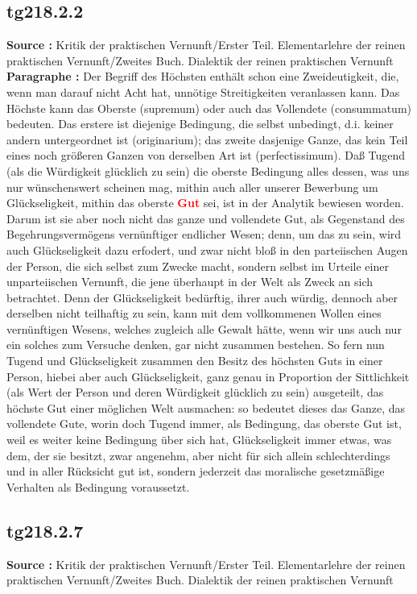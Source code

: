 \documentclass[a4paper,12pt,twoside]{book}
\newcommand{\match}[1]{\textcolor{red}{\textbf{#1}}}
\begin{document}
	\subsection*{tg218.2.2} 
	\textbf{Source : }Kritik der praktischen Vernunft/Erster Teil. Elementarlehre der reinen praktischen Vernunft/Zweites Buch. Dialektik der reinen praktischen Vernunft\\  
	
	\noindent\textbf{Paragraphe : }Der Begriff des Höchsten enthält schon eine Zweideutigkeit, die, wenn man darauf nicht Acht hat, unnötige Streitigkeiten veranlassen kann. Das Höchste kann das Oberste (supremum) oder auch das Vollendete (consummatum) bedeuten. Das erstere ist diejenige Bedingung, die selbst unbedingt, d.i. keiner andern untergeordnet ist (originarium); das zweite dasjenige Ganze, das kein Teil eines noch größeren Ganzen von derselben Art ist (perfectissimum). Daß Tugend (als die Würdigkeit glücklich zu sein) die oberste Bedingung alles dessen, was uns nur wünschenswert scheinen mag, mithin auch aller unserer Bewerbung um Glückseligkeit, mithin das oberste \match{Gut} sei, ist in der Analytik bewiesen worden. Darum ist sie aber noch nicht das ganze und vollendete Gut, als Gegenstand des Begehrungsvermögens vernünftiger endlicher Wesen; denn, um das zu sein, wird auch Glückseligkeit dazu erfodert, und zwar nicht bloß in den parteiischen Augen der Person, die sich selbst zum Zwecke macht, sondern selbst im Urteile einer unparteiischen Vernunft, die jene überhaupt in der Welt als Zweck an sich betrachtet. Denn der Glückseligkeit bedürftig, ihrer auch würdig, dennoch aber derselben nicht teilhaftig zu sein, kann mit dem vollkommenen Wollen eines vernünftigen Wesens, welches zugleich alle Gewalt hätte, wenn wir uns auch nur ein solches zum Versuche denken, gar nicht zusammen bestehen. So fern nun Tugend  und Glückseligkeit zusammen den Besitz des höchsten Guts in einer Person, hiebei aber auch Glückseligkeit, ganz genau in Proportion der Sittlichkeit (als Wert der Person und deren Würdigkeit glücklich zu sein) ausgeteilt, das höchste Gut einer möglichen Welt ausmachen: so bedeutet dieses das Ganze, das vollendete Gute, worin doch Tugend immer, als Bedingung, das oberste Gut ist, weil es weiter keine Bedingung über sich hat, Glückseligkeit immer etwas, was dem, der sie besitzt, zwar angenehm, aber nicht für sich allein schlechterdings und in aller Rücksicht gut ist, sondern jederzeit das moralische gesetzmäßige Verhalten als Bedingung voraussetzt. 
	
	\subsection*{tg218.2.7} 
	\textbf{Source : }Kritik der praktischen Vernunft/Erster Teil. Elementarlehre der reinen praktischen Vernunft/Zweites Buch. Dialektik der reinen praktischen Vernunft\\  
	
\end{document}
